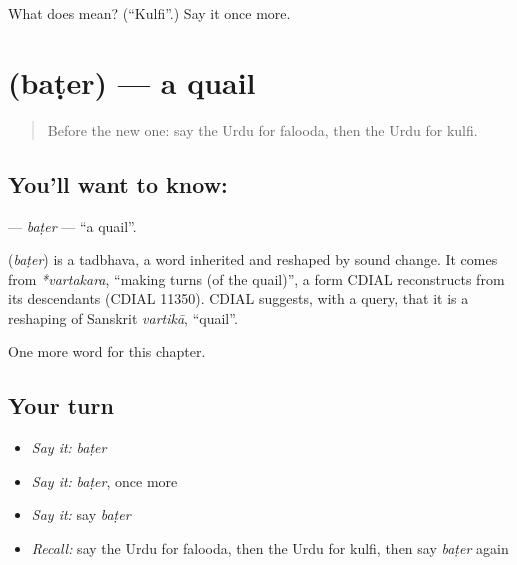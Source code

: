 \begin{tcolorbox}[breakable,colback=teal!4,colframe=teal!35!black,title={Before you move on}]
What does  mean? (\textquotedblleft{}Kulfi\textquotedblright{}.) Say it once more.
\end{tcolorbox}
\section[\texorpdfstring{\ur{بٹیر} (baṭer)}{بٹیر (baṭer)}]{ (baṭer) — a quail}

\label{lesson:UR-C175-bater}



\begin{quote}
Before the new one: say the Urdu for falooda, then the Urdu for kulfi.
\end{quote}

\subsection*{You'll want to know: }
\textbf{} — \emph{baṭer} — \textquotedblleft{}a quail\textquotedblright{}.

\begin{cousinweb}
\textbf{} (\emph{baṭer}) is a tadbhava, a word inherited and reshaped by sound change. It comes from \emph{*vartakara}, \textquotedblleft{}making turns (of the quail)\textquotedblright{}, a form CDIAL reconstructs from its descendants (CDIAL 11350). CDIAL suggests, with a query, that it is a reshaping of Sanskrit \emph{vartikā}, \textquotedblleft{}quail\textquotedblright{}.
\end{cousinweb}

\begin{grammarlens}[title={What you've built}]
One more word for this chapter.
\end{grammarlens}

\subsection*{Your turn}
\begin{itemize}
\raggedright
  \item \emph{Say it:} \emph{baṭer}
  \item \emph{Say it:} \emph{baṭer}, once more
  \item \emph{Say it:} say \emph{baṭer}
  \item \emph{Recall:} say the Urdu for falooda, then the Urdu for kulfi, then say \emph{baṭer} again
\end{itemize}

